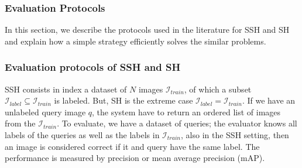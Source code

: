 \documentclass{article}
\begin{document}

\subsubsection{Evaluation Protocols} %

 

In this section, we describe the protocols used in the literature for SSH and SH and explain how a simple strategy efficiently solves the similar problems.

\subsubsection*{Evaluation protocols of SSH and SH}

SSH consists in index a dataset of $N$ images $\mathcal{I}_{train}$, of which a subset $\mathcal{I}_{label} \subseteq \mathcal{I}_{train}$ is labeled.  But, SH is the extreme case $\mathcal{I}_{label} = \mathcal{I}_{train}$. If we have an unlabeled query image $q$, the system have to return an ordered list of images from the $\mathcal{I}_{train}$. To evaluate, we have a dataset of queries; the evaluator knows all labels of the queries as well as the labels in $\mathcal{I}_{train}$, also in the SSH setting, then an image is considered correct if it and query have the same label. The performance is measured by precision or mean average precision (mAP).
\end{document}
